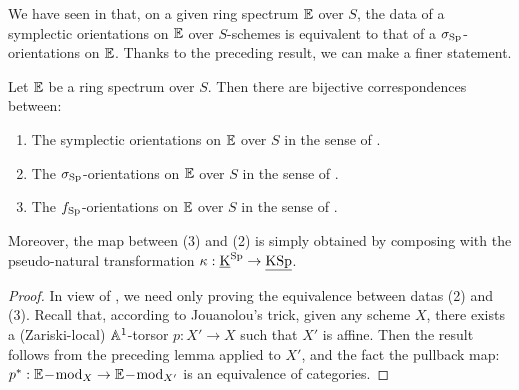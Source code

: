We have seen in  that,
 on a given ring spectrum $\E$ over $S$,
 the data of a  symplectic orientations on $\E$ over $S$-schemes
 is equivalent to that of a $\sigma_\Sp$-orientations on $\E$.
 Thanks to the preceding result, we can make a finer statement.
\begin{prop}\label{prop:sp-or&KSp-or}
Let $\E$ be a ring spectrum over $S$.
 Then there are bijective correspondences between:
\begin{enumerate}
\item The symplectic orientations on $\E$ over $S$ in the sense of .
\item The $\sigma_\Sp$-orientations on $\E$ over $S$ in the sense of .
\item The $f_\Sp$-orientations on $\E$ over $S$ in the sense of .
\end{enumerate}
Moreover, the map between (3) and (2) is simply obtained by composing with
 the pseudo-natural transformation $\kappa:\uK^\Sp \rightarrow \uKSp$.
\end{prop}
\begin{proof}
In view of , we need only proving the equivalence
 between datas (2) and (3). Recall that, according to Jouanolou's trick,
 given any scheme $X$, there exists a (Zariski-local) $\AA^1$-torsor
 $p:X' \rightarrow X$
 such that $X'$ is affine.
 Then the result follows from the preceding lemma applied to $X'$,
 and the fact the pullback map: $p^*:\E\modd_X \rightarrow \E\modd_{X'}$
 is an equivalence of categories.
\end{proof}

